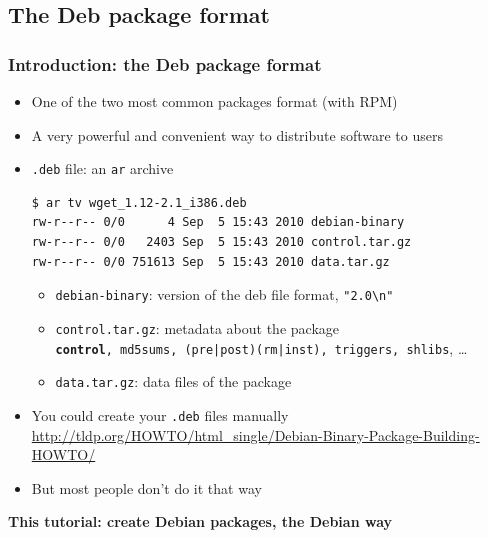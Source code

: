 \documentclass[10pt,final]{beamer}
\begin{document}
\subsection{The Deb package format}
\begin{frame}[fragile]
	\frametitle{Introduction: the Deb package format}
\begin{itemize}
	\item One of the two most common packages format (with RPM)
	\item A very powerful and convenient way to distribute software to users
	\item \texttt{.deb} file: an \texttt{ar} archive
\begin{lstlisting}[basicstyle=\ttfamily\footnotesize]
$ ar tv wget_1.12-2.1_i386.deb
rw-r--r-- 0/0      4 Sep  5 15:43 2010 debian-binary
rw-r--r-- 0/0   2403 Sep  5 15:43 2010 control.tar.gz
rw-r--r-- 0/0 751613 Sep  5 15:43 2010 data.tar.gz
\end{lstlisting}
\begin{itemize}
	\item \texttt{debian-binary}: version of the deb file format, \texttt{"2.0\textbackslash{}n"}
	\item \texttt{control.tar.gz}: metadata about the package\\
		{\small \texttt{\textbf{control}, md5sums, (pre|post)(rm|inst), triggers, shlibs}, \ldots}
	\item \texttt{data.tar.gz}: data files of the package
\end{itemize}
\item You could create your \texttt{.deb} files manually\\
	{\footnotesize \url{http://tldp.org/HOWTO/html\_single/Debian-Binary-Package-Building-HOWTO/}}
\item But most people don't do it that way
\end{itemize}
\hbr
\centerline{\textbf{This tutorial: create Debian packages, the Debian way}}
\end{frame}
\end{document}
